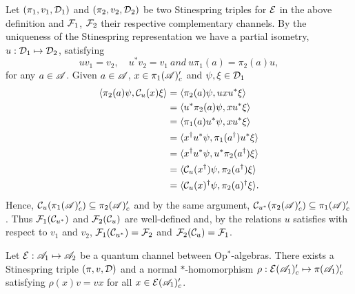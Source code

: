 \documentclass[12pt]{article}
\begin{document}
\begin{remark}\label{pi}
	
	Let $(\pi_1, v_1, \mathcal{D}_1)$ and $(\pi_2, v_2, \mathcal{D}_2)$ be two Stinespring triples for $\mathcal{E}$ in the above definition 
	and $\mathcal{F}_1$, $\mathcal{F}_2$ their respective complementary channels.
	By the uniqueness of the Stinespring representation we have 
	a partial isometry, $u: \mathcal{D}_1 \mapsto \mathcal{D}_2$, satisfying \[uv_1 = v_2, \quad u^*v_2 = v_1 \ and \ u\pi_1(a) = \pi_2(a)u,\] for any $a \in \mathscr{A}$.
	Given $a \in \mathscr{A}$, $x \in \pi_1(\mathscr{A})'_c$ and $\psi, \xi \in \mathcal{D}_1$
	\begin{align*}
		\langle \pi_2(a)\psi, \mathcal{C}_u(x)\xi \rangle &= \langle \pi_2(a)\psi, uxu^*\xi \rangle \\
					&= \langle u^*\pi_2(a)\psi, xu^*\xi \rangle \\
					&= \langle \pi_1(a)u^*\psi, xu^*\xi \rangle \\
					&= \langle x^\dagger u^*\psi, \pi_1(a^\dagger)u^*\xi \rangle \\
					&= \langle x^\dagger u^*\psi, u^*\pi_2(a^\dagger)\xi \rangle \\ 
					&= \langle \mathcal{C}_u(x^\dagger)\psi, \pi_2(a^\dagger)\xi \rangle \\
					&= \langle \mathcal{C}_u(x)^\dagger\psi, \pi_2(a)^\dagger\xi \rangle.
	\end{align*}
	Hence, $\mathcal{C}_u(\pi_1(\mathscr{A})'_c) \subseteq \pi_2(\mathscr{A})'_c$ and by the same argument, $\mathcal{C}_{u^*}(\pi_2(\mathscr{A})'_c) \subseteq \pi_1(\mathscr{A})'_c$. 
	Thus $\mathcal{F}_1(\mathcal{C}_{u^*})$ and $\mathcal{F}_2(\mathcal{C}_{u})$ are well-defined and, by the relations $u$ satisfies with respect to $v_1$ and $v_2$, 
	$\mathcal{F}_1(\mathcal{C}_{u^*}) = \mathcal{F}_2$ and $\mathcal{F}_2(\mathcal{C}_u) = \mathcal{F}_1$.
	
	

\end{remark}

\begin{theorem} 
	Let $\mathcal{E}: \mathscr{A}_1 \mapsto \mathscr{A}_2$ be a quantum channel between Op$^*$-algebras. 
	There exists a Stinespring triple $(\pi, v, \mathcal{D})$ and a normal $*$-homomorphism $\rho: \mathcal{E}(\mathscr{A}_1)'_c \mapsto \pi(\mathscr{A}_1)'_c$
	satisfying $\rho(x)v = vx$ for all $x \in \mathcal{E}(\mathscr{A}_1)'_c$.
\end{theorem}
\end{document}
